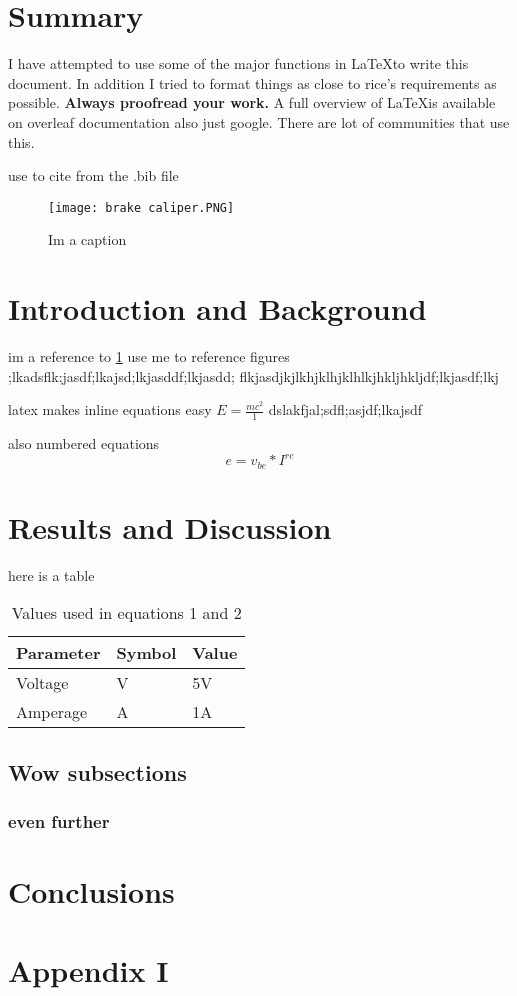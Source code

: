 \documentclass[a4paper,11pt]{MeLabtexMemo}
\begin{document}
\maketitle



\section{Summary}
I have attempted to use some of the major functions in \LaTeX to write this document. In addition I tried to format things as close to rice's requirements as possible. \textbf{Always proofread your work.}  A full overview of \LaTeX is available on overleaf documentation also just google. There are lot of communities that use this. \par
 use \cite{noauthor_phase_nodate} to cite from the .bib file
\begin{figure}[H] %
    \centering
    \texttt{[image: brake caliper.PNG]}
    \caption{Im a caption}
    \label{fig:my_label}
\end{figure}
\section{Introduction and Background}

im a reference to \cref{fig:my_label} use me to reference figures ;lkadsflk;jasdf;lkajsd;lkjasddf;lkjasdd;
flkjasdjkjlkhjklhjklhlkjhkljhkljdf;lkjasdf;lkj \par %

latex makes inline equations easy
\begin{math}
    E = \frac{mc^2}{1}
\end{math}
dslakfjal;sdfl;asjdf;lkajsdf \par
also numbered equations
\begin{equation} %
    e = v_{be} * I^{re}
\end{equation}
\section{Results and Discussion}

here is a table 
\begin{longtable}{lll}
\caption{Values used in equations 1 and 2}
\label{tab:my-table}\\
Parameter & Symbol & Value \\
\endhead
%
Voltage & V & 5V \\
Amperage & A & 1A
\end{longtable}

\subsection{Wow subsections}
\subsubsection{even further}


\section{Conclusions}
\appendix
\section{Appendix I}
 
\printbibliography %
\end{document}
